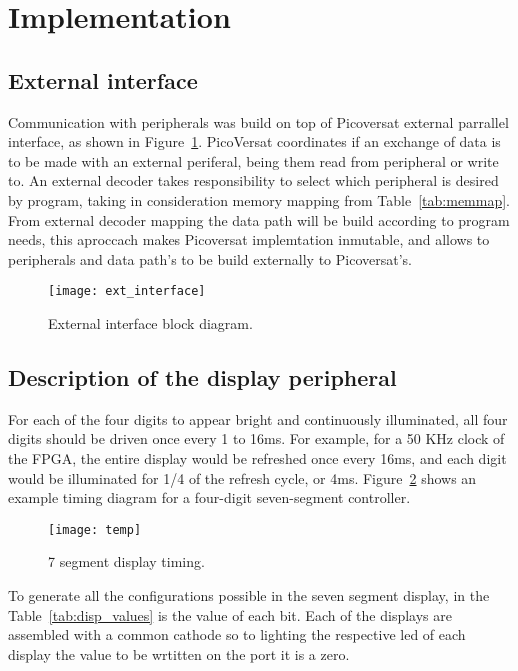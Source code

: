 \section{Implementation}
\label{sec:impl}

\subsection{External interface}
Communication with peripherals was build on top of Picoversat external parrallel interface, as shown 
in Figure~\ref{fig:ext_interface}. PicoVersat coordinates if an exchange of data is to be made with an external periferal, 
being them read from peripheral or write to. An external decoder takes responsibility to select which 
peripheral is desired by program, taking in consideration memory mapping from Table~\ref{tab:memmap}. From external decoder 
mapping the data path will be build according to program needs, this aproccach makes Picoversat implemtation 
inmutable, and allows to peripherals and data path's to be build externally to Picoversat's.

\vspace{10pt}
\begin{figure}[!htbp]
    \centerline{\texttt{[image: ext\_interface]}}
    \vspace{0cm}\caption{External interface block diagram.}
    \label{fig:ext_interface}
\end{figure}

\clearpage
\subsection{Description of the display peripheral}

For each of the four digits to appear bright and continuously illuminated, all four digits should 
be driven once every 1 to 16ms. For example, for a 50 KHz clock of the FPGA, the entire display would be 
refreshed once every 16ms, and each digit would be illuminated for 1/4 of the refresh cycle, 
or 4ms. Figure~\ref{fig:temp} shows an example timing diagram for a four-digit seven-segment controller. 

\begin{figure}[!htbp]
    \centerline{\texttt{[image: temp]}}
    \vspace{0cm}\caption{7 segment display timing.}
    \label{fig:temp}
\end{figure}

\vspace{10pt}
\noindent To generate all the configurations possible in the seven segment display, 
in the Table~\ref{tab:disp_values} is the value of each bit. Each of the displays are assembled with
a common cathode so to lighting the respective led of each display the value to be wrtitten on the 
port it is a zero.

